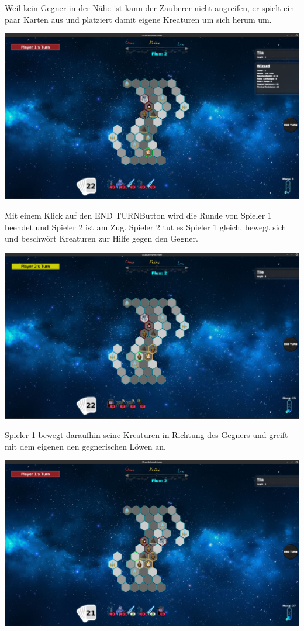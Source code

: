 \documentclass[a4paper,12pt]{scrartcl}
\begin{document}
	Weil kein Gegner in der Nähe ist kann der Zauberer nicht angreifen, er spielt ein paar Karten aus und platziert damit eigene Kreaturen um sich herum um.
	\begin{center}\includegraphics[width=\textwidth]{Prog2_EA_V2/screenshots/Anwendung4.png}\end{center}
	Mit einem Klick auf den \glqq END TURN\grqq Button wird die Runde von Spieler 1 beendet und Spieler 2 ist am Zug. Spieler 2 tut es Spieler 1 gleich, bewegt sich und beschwört Kreaturen zur Hilfe gegen den Gegner.
	\begin{center}\includegraphics[width=\textwidth]{Prog2_EA_V2/screenshots/Anwendung5.png}\end{center}
	Spieler 1 bewegt daraufhin seine Kreaturen in Richtung des Gegners und greift mit dem eigenen den gegnerischen Löwen an.
	\begin{center}\includegraphics[width=\textwidth]{Prog2_EA_V2/screenshots/Anwendung6.png}\end{center}
\end{document}
